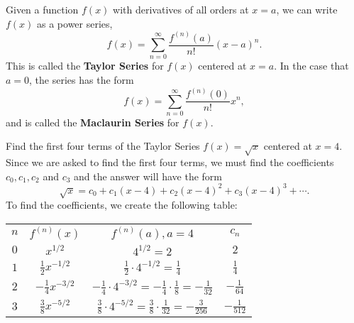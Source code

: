 \documentclass{ximera}
\begin{document}
\begin{theorem}
Given a function $f(x)$ with derivatives of all orders at $x = a$, we can write $f(x)$ as a power series,
\[
f(x) = \sum_{n=0}^\infty \frac{f^{(n)}(a)}{n!} (x-a)^n.
\]
This is called the \textbf{Taylor Series} for $f(x)$ centered at $x = a$. In the case that $a = 0$, the series has the form
\[
 f(x) = \sum_{n=0}^\infty \frac{f^{(n)}(0)}{n!} x^n,
\]
and is called the \textbf{Maclaurin Series} for $f(x)$.
\end{theorem}

\begin{example} Find the first four terms of the Taylor Series $f(x) = \sqrt x$ centered at $x = 4$.\\
Since we are asked to find the first four terms, we must find the coefficients $c _0, c_1, c_2$ and $c_3$
and the answer will have the form 
\[
\sqrt x = c_0 + c_1(x-4) + c_2(x-4)^2 + c_3(x-4)^3 + \cdots .
\]
To find the coefficients, we create the following table:

\begin{center}
\begin{tabular}{|c|c|c|c|}
\hline

$n$ & $f^{(n)}(x)$ & $f^{(n)}(a), a = 4$ & $c_n$ \\[8pt]

$0$ & $x^{1/2}$ & $4^{1/2} = 2$ & $2$ \\[8pt]

$1$ & $\frac12 x^{-1/2}$ & $\frac12 \cdot 4^{-1/2} = \frac14$ & $\frac14$ \\[8pt]

$2$ & $-\frac14 x^{-3/2}$ & $-\frac14 \cdot 4^{-3/2} = -\frac14 \cdot \frac18 = -\frac{1}{32}$ & $-\frac{1}{64}$ \\[8pt]

$3$ & $\frac38 x^{-5/2}$ & $\frac38 \cdot 4^{-5/2} = \frac38 \cdot \frac{1}{32} = -\frac{3}{256}$ & $-\frac{1}{512}$ \\[8pt]

\end{tabular}
\end{center}



\end{example}
\end{document}
